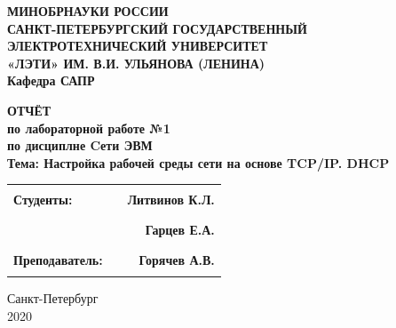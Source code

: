 \documentclass[a4paper,12pt]{article}
\begin{document}
\thispagestyle{empty} %

\begin{centering}
\textbf{
{\large МИНОБРНАУКИ РОССИИ\\
САНКТ-ПЕТЕРБУРГСКИЙ ГОСУДАРСТВЕННЫЙ\\
ЭЛЕКТРОТЕХНИЧЕСКИЙ УНИВЕРСИТЕТ\\
«ЛЭТИ» ИМ. В.И. УЛЬЯНОВА (ЛЕНИНА)\\
Кафедра САПР}\\
}
\end{centering}


\vspace{7cm}

\begin{centering}
\textbf{{\large 
ОТЧЁТ\\
по лабораторной работе №1\\
по дисциплне \guillemotleft Cети ЭВМ\guillemotright\\
Тема: \guillemotleft Настройка рабочей среды сети на основе TCP/IP.
DHCP\guillemotright\\
}}
\end{centering}

\vspace{4cm}

\begin{tabular}{l c r}
    \textbf{{\large Студенты:}}& \rule{4cm}{1pt} & \textbf{{\large Литвинов К.Л.}}\\
    \textbf{}& \rule{4cm}{1pt} &\textbf{{\large Гарцев Е.А.}}\\
    \textbf{{\large Преподаватель:}}& \hspace{2cm} \rule{4cm}{1pt} \hspace{2cm} & \textbf{{\large Горячев А.В.}}\\
\end{tabular}

\vspace{6cm}


\begin{centering}
	{\large
Санкт-Петербург \\
2020 \\
}
\end{centering}

\newpage
\end{document}
